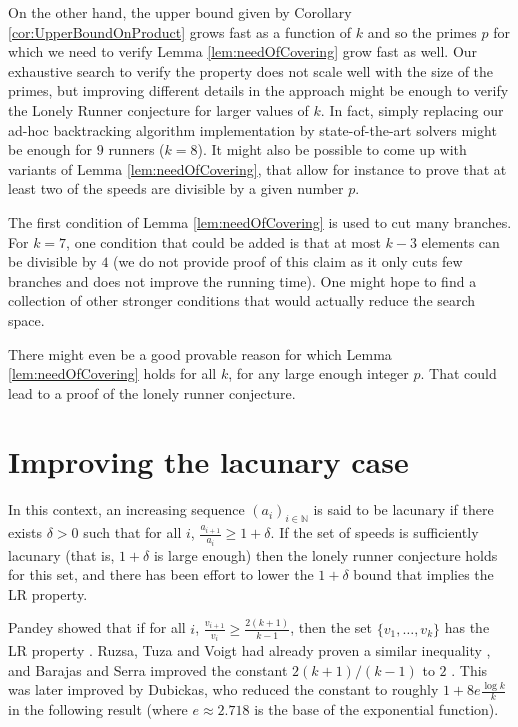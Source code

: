 \documentclass[11pt,a4paper]{article}
\theoremstyle{definition}
\theoremstyle{remark}
\begin{document}
On the other hand, the upper bound given by Corollary \ref{cor:UpperBoundOnProduct} grows fast as a function of $k$ and so the primes $p$ for which we need to verify Lemma \ref{lem:needOfCovering} grow fast as well. Our exhaustive search to verify the property does not scale well with the size of the primes, but improving different details in the approach might be enough to verify the Lonely Runner conjecture for larger values of $k$. In fact, simply replacing our ad-hoc backtracking algorithm implementation by state-of-the-art solvers might be enough for $9$ runners ($k=8$). It might also be possible to come up with variants of Lemma \ref{lem:needOfCovering}, that allow for instance to prove that at least two of the speeds are divisible by a given number $p$.

The first condition of Lemma \ref{lem:needOfCovering} is used to cut many branches. For $k=7$, one condition that could be added is that at most $k-3$ elements can be divisible by $4$ (we do not provide proof of this claim as it only cuts few branches and does not improve the running time). One might hope to find a collection of other stronger conditions that would actually reduce the search space.

There might even be a good provable reason for which Lemma \ref{lem:needOfCovering} holds for all $k$, for any large enough integer $p$. That could lead to a proof of the lonely runner conjecture. 


\section{Improving the lacunary case}
\label{sec:lacunary}
In this context, an increasing sequence $(a_i)_{i\in\mathbb{N}}$ is said to be lacunary if there exists $\delta>0$ such that for all $i$, $\frac{a_{i+1}}{a_i}\ge 1+\delta$. If the set of speeds is sufficiently lacunary (that is, $1+\delta$ is large enough) then the lonely runner conjecture holds for this set, and there has been effort to lower the $1+\delta$ bound that implies the LR property.

Pandey showed that if for all $i$, $\frac{v_{i+1}}{v_i}\ge\frac{2(k+1)}{k-1}$, then the set $\{v_1,\ldots, v_k \}$ has the LR property \cite{pandey2009note}. Ruzsa, Tuza and Voigt had already proven a similar inequality \cite{RUZSA2002181}, and Barajas and Serra improved the constant $2(k+1)/(k-1)$ to $2$ \cite{BARAJAS20095687}. This was later improved by Dubickas, who reduced the constant to roughly $1+8e\frac{\log k}{k}$ in the following result (where $e\approx2.718$ is the base of the exponential function).
\end{document}
